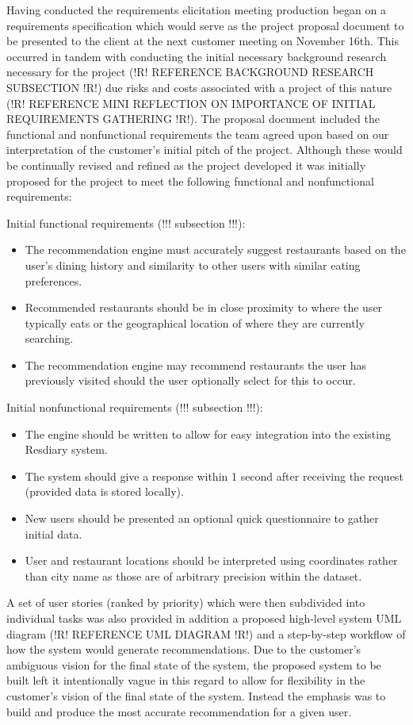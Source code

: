 \documentclass{l3proj}
\begin{document}
Having conducted the requirements elicitation meeting production began on a requirements specification which would serve as the project proposal document to be presented to the client at the next customer meeting on November 16th. This occurred in tandem with conducting the initial necessary background research necessary for the project (!R! REFERENCE BACKGROUND RESEARCH SUBSECTION !R!) due risks and costs associated with a project of this nature (!R! REFERENCE MINI REFLECTION ON IMPORTANCE OF INITIAL REQUIREMENTS GATHERING !R!). The proposal document included the functional and nonfunctional requirements the team agreed upon based on our interpretation of the customer’s initial pitch of the project. Although these would be continually revised and refined as the project developed it was initially proposed for the project to meet the following functional and nonfunctional requirements:

Initial functional requirements (!!! subsection !!!):
\begin{itemize}
\item The recommendation engine must accurately suggest restaurants based on the user’s dining history and similarity to other users with similar eating preferences.
\item Recommended restaurants should be in close proximity to where the user typically eats or the geographical location of where they are currently searching.
\item The recommendation engine may recommend restaurants the user has previously visited should the user optionally select for this to occur.
\end{itemize}

Initial nonfunctional requirements (!!! subsection !!!):
\begin{itemize}
\item The engine should be written to allow for easy integration into the existing Resdiary system.
\item The system should give a response within 1 second after receiving the request (provided data is stored locally).
\item New users should be presented an optional quick questionnaire to gather initial data.
\item User and restaurant locations should be interpreted using coordinates rather than city  name as those are of arbitrary precision within the dataset.
\end{itemize}

A set of user stories (ranked by priority) which were then subdivided into individual tasks was also provided in addition a proposed high-level system UML diagram (!R! REFERENCE UML DIAGRAM !R!) and a step-by-step workflow of how the system would generate recommendations. Due to the customer’s ambiguous vision for the final state of the system, the proposed system to be built left it intentionally vague in this regard to allow for flexibility in the customer’s vision of the final state of the system. Instead the emphasis was to build and produce the most accurate recommendation for a given user.
\end{document}
